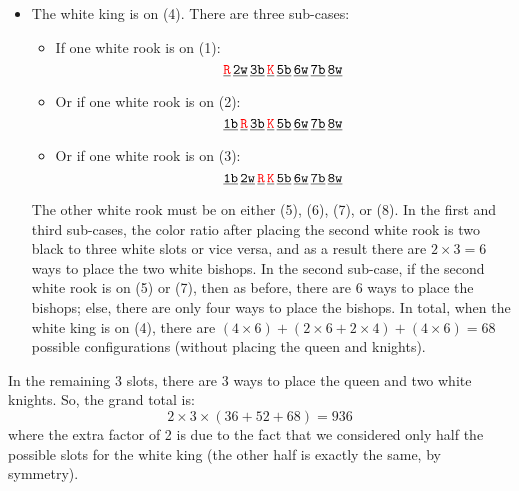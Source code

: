 \documentclass[11pt]{article}
\begin{document}
\begin{itemize}
	
	\item The white king is on (4).  There are three sub-cases:
	\begin{itemize}
		\item If one white rook is on (1):
		\begin{equation*}
		\underline{\texttt{\textcolor{red}{R}}}\,
		\underline{\texttt{2w}}\,
		\underline{\texttt{3b}}\,
		\underline{\texttt{\textcolor{red}{K}}}\,
		\underline{\texttt{5b}}\,
		\underline{\texttt{6w}}\,
		\underline{\texttt{7b}}\,
		\underline{\texttt{8w}}
		\end{equation*}
		
		
		\item Or if one white rook is on (2):
		\begin{equation*}
		\underline{\texttt{1b}}\,
		\underline{\texttt{\textcolor{red}{R}}}\,
		\underline{\texttt{3b}}\,
		\underline{\texttt{\textcolor{red}{K}}}\,
		\underline{\texttt{5b}}\,
		\underline{\texttt{6w}}\,
		\underline{\texttt{7b}}\,
		\underline{\texttt{8w}}
		\end{equation*}
		
		
		\item Or if one white rook is on (3):
		\begin{equation*}
		\underline{\texttt{1b}}\,
		\underline{\texttt{2w}}\,
		\underline{\texttt{\textcolor{red}{R}}}\,
		\underline{\texttt{\textcolor{red}{K}}}\,
		\underline{\texttt{5b}}\,
		\underline{\texttt{6w}}\,
		\underline{\texttt{7b}}\,
		\underline{\texttt{8w}}
		\end{equation*}
	\end{itemize}
	The other white rook must be on either (5), (6), (7), or (8). In the first and third sub-cases, the color ratio after placing the second white rook is two black to three white slots or vice versa, and as a result there are $2\times 3 = 6$ ways to place the two white bishops. In the second sub-case, if the second white rook is on (5) or (7), then as before, there are 6 ways to place the bishops; else, there are only four ways to place the bishops. In total, when the white king is on (4), there are $(4\times 6) + (2\times6 + 2\times4) + (4\times 6) = \boxed{68}$ possible configurations (without placing the queen and knights).
\end{itemize}


In the remaining 3 slots, there are 3 ways to place the queen and two white knights. So, the grand total is:
\begin{equation*}
2 \times 3\times(36+52+68) = \boxed{936}
\end{equation*}
where the extra factor of 2 is due to the fact that we considered only half the possible slots for the white king (the other half is exactly the same, by symmetry).
\end{document}
